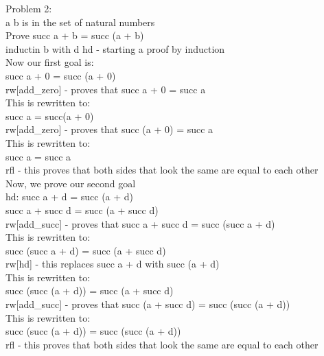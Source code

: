 \documentclass{article}
\theoremstyle{theorem}
\theoremstyle{definition}
\theoremstyle{remark}
\begin{document}
Problem 2:\\
a b is in the set of natural numbers\\
Prove succ a + b = succ (a + b)\\
inductin b with d hd - starting a proof by induction\\
Now our first goal is:\\
succ a + 0 = succ (a + 0)\\
rw[add\_zero] - proves that succ a + 0 = succ a\\
This is rewritten to:\\
succ a = succ(a + 0)\\
rw[add\_zero] - proves that succ (a + 0) = succ a\\
This is rewritten to:\\
succ a = succ a\\
rfl - this proves that both sides that look the same are equal to each other \\
Now, we prove our second goal\\
hd: succ a + d = succ (a + d)\\
succ a + succ d = succ (a + succ d)\\
rw[add\_succ] - proves that succ a + succ d = succ (succ a + d)\\
This is rewritten to:\\
succ (succ a + d) = succ (a + succ d)\\
rw[hd] - this replaces succ a + d with succ (a + d)\\
This is rewritten to:\\
succ (succ (a + d)) = succ (a + succ d)\\
rw[add\_succ] - proves that succ (a + succ d) = succ (succ (a + d))\\
This is rewritten to:\\
succ (succ (a + d)) = succ (succ (a + d))\\
rfl - this proves that both sides that look the same are equal to each other \\
\end{document}
